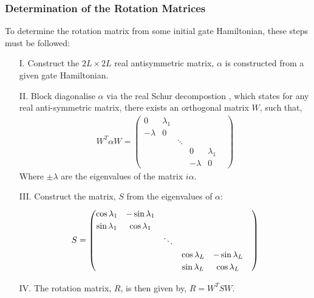 \subsubsection{Determination of the Rotation Matrices}
To determine the rotation matrix from some initial gate Hamiltonian, these steps must be followed:
\begin{itemize}
    \item[I.] Construct the $2L\times 2L$ real antisymmetric matrix, $\alpha$ is constructed from a given gate Hamiltonian.
    \item[II.] Block diagonalise $\alpha$ via the real Schur decompostion \cite{horn_johnson_1985}, which states for any real anti-symmetric matrix, there exists an orthogonal matrix $W$, such that, 
    \begin{align}
        W^{T} \alpha W = \begin{pmatrix}
            0 & \lambda_1 & &&\\
            - \lambda & 0 &&&\\
            && \ddots&&&\\
            &&& 0 & \lambda_1 \\
            &&& - \lambda & 0 
        \end{pmatrix}
    \end{align}
    Where $\pm \lambda$ are the eigenvalues of the matrix $i\alpha$. 
    \item[III.] Construct the matrix, $S$ from the eigenvalues of $\alpha$:
    \begin{equation}
    {\renewcommand{\arraystretch}{1.2}
        S =\begin{pmatrix}
            \cos\lambda_1 & -\sin\lambda_1 \\
            \sin\lambda_1 & \cos\lambda_1 \\
            && \ddots&&&\\
            &&&  \cos\lambda_L & -\sin\lambda_L \\
            &&& \sin\lambda_L & \cos\lambda_L
        \end{pmatrix}}
    \end{equation}

    \item[IV.] The rotation matrix, $R$, is then given by, $R = W^{T} S W$.
\end{itemize}

